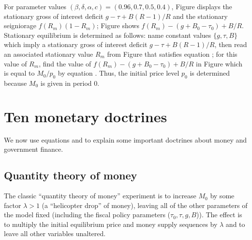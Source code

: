 For parameter values $(\beta, \delta, \alpha, c) =
(0.96, 0.7, 0.5, 0.4)$,
Figure  displays the
stationary gross of
interest deficit $g- \tau+B(R-1)/R$ and the stationary seigniorage
$f(R_m)(1-R_m)$;
%
Figure  shows $f(R_m) - (g +B_0 -\tau_0) + B / R$. %
 Stationary equilibrium is
determined as follows:  name constant values $\{g,\tau,B\}$ which
imply a stationary gross of interest
deficit $g-\tau+ B(R-1)/R$, then read an associated stationary
value $R_m$
from %
Figure  that satisfies equation ; for this
value of $R_m$, find the value of $f(R_m) - (g +B_0 -\tau_0) + B / R$
in Figure  which is equal to $M_0/p_0$ by equation
. Thus, the initial price level $p_0$ is
determined because $M_0$ is given in period $0$.






\section{Ten monetary doctrines}\label{sec:10Mdoctrines}%
We now use equations  and  to explain
some important doctrines about money and government finance.
%
\subsection{Quantity theory of money}
  The classic ``quantity theory of money'' experiment is to increase
$M_0$ by some factor $\lambda >1$ (a ``helicopter drop'' of money),
leaving all of the other parameters of the model fixed (including the
fiscal policy parameters ($\tau_0, \tau,g, B$)).  The effect is to
multiply the initial equilibrium price and money supply sequences
by $\lambda$ and to leave all other variables unaltered.
